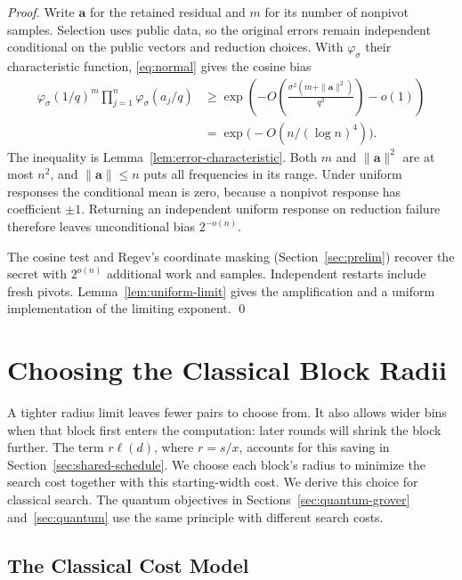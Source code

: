 \documentclass[runningheads,envcountsame,envcountsect,orivec]{llncs}
\begin{document}
\begin{proof}
Write $\boldsymbol a$ for the retained residual and $m$ for
its number of nonpivot samples. Selection uses public data,
so the original errors remain independent conditional on the
public vectors and reduction choices. With $\varphi_\sigma$ their characteristic
function, \eqref{eq:normal} gives the cosine bias
\begin{align}
 \varphi_\sigma(1/q)^m
       \prod_{j=1}^n\varphi_\sigma(a_j/q)
 &\ge\exp\!\left(-O\!\left(
     \frac{\sigma^2(m+\|\boldsymbol a\|^2)}{q^2}\right)-o(1)\right)
       \nonumber\\
 &=\exp\bigl(-O(n/(\log n)^4)\bigr).
\end{align}
The inequality is Lemma~\ref{lem:error-characteristic}.
Both $m$ and $\|\boldsymbol a\|^2$ are at most $n^2$,
and $\|\boldsymbol a\|\le n$ puts all frequencies in its
range. Under uniform responses the conditional mean is zero,
because a nonpivot response has coefficient $\pm1$.
Returning an independent uniform response on reduction
failure therefore leaves unconditional bias $2^{-o(n)}$.

The cosine test and Regev's coordinate masking
(Section~\ref{sec:prelim}) recover the secret with
$2^{o(n)}$ additional work and samples. Independent
restarts include fresh pivots.
Lemma~\ref{lem:uniform-limit} gives the amplification and a
uniform implementation of the limiting exponent.
\qed
\end{proof}

\section{Choosing the Classical Block Radii}
\label{sec:radius-separation}

A tighter radius limit leaves fewer pairs to choose from. It also
allows wider bins when that block first enters the computation:
later rounds will shrink the block further. The term $r\ell(d)$,
where $r=s/x$, accounts for this saving in
Section~\ref{sec:shared-schedule}. We choose each block's radius
to minimize the search cost together with this starting-width
cost. We derive this choice for classical search. The quantum
objectives in Sections~\ref{sec:quantum-grover} and~\ref{sec:quantum}
use the same principle with different search costs.

\subsection{The Classical Cost Model}
\end{document}
